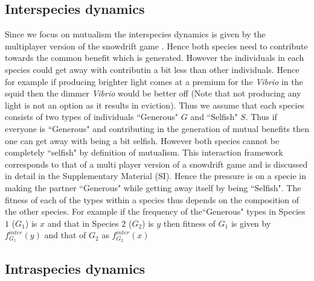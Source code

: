 \documentclass{pnastwo}
\begin{document}
\begin{article}
\subsection{Interspecies dynamics}

Since we focus on mutualism the interspecies dynamics is given by the multiplayer version of the snowdrift game \cite{bergstrom:PNAS:2003,souza:JTB:2009,gokhale:PRSB:2012}.
Hence both species need to contribute towards the common benefit which is generated.
However the individuals in each species could get away with contributin a bit less than other individuals.
Hence for example if producing brighter light comes at a premium for the \textit{Vibrio} in the squid then the dimmer \textit{Vibrio} would be better off (Note that not producing any light is not an option as it results in eviction).
Thus we assume that each species consists of two types of individuals ``Generous" $G$ and ``Selfish" $S$. 
Thus if everyone is ``Generous" and contributing in the generation of mutual benefits then one can get away with being a bit selfish. However both species cannot be completely ``selfish" by definition of mutualism.
This interaction framework corresponds to that of a multi player version of a snowdrift game and is discussed in detail in the Supplementary Material (SI).
Hence the pressure is on a specie in making the partner ``Generous" while getting away itself by being ``Selfish".
The fitness of each of the types within a species thus depends on the composition of the other species.
For example if the frequency of the``Generous" types in Species $1$ ($G_1$) is $x$ and that in Species $2$ ($G_2$) is $y$ then fitness of $G_1$  is given by $f^{inter}_{G_1} (y)$ and that of $G_2$ as $f^{inter}_{G_2} (x)$

\subsection{Intraspecies dynamics}


\end{article}
\end{document}
